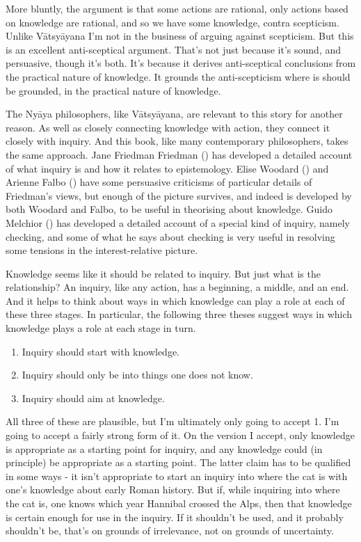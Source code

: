 \documentclass[
  10pt,
  letterpaper,
  twoside]{scrbook}
\providecommand{\tightlist}{%
  \setlength{\itemsep}{0pt}\setlength{\parskip}{0pt}}\usepackage{longtable,booktabs,array}
\begin{document}
More bluntly, the argument is that some actions are rational, only
actions based on knowledge are rational, and so we have some knowledge,
contra scepticism. Unlike Vātsyāyana I'm not in the business of arguing
against scepticism. But this is an excellent anti-sceptical argument.
That's not just because it's sound, and persuasive, though it's both.
It's because it derives anti-sceptical conclusions from the practical
nature of knowledge. It grounds the anti-scepticism where is should be
grounded, in the practical nature of knowledge.

The Nyāya philosophers, like Vātsyāyana, are relevant to this story for
another reason. As well as closely connecting knowledge with action,
they connect it closely with inquiry. And this book, like many
contemporary philosophers, takes the same approach. Jane Friedman
Friedman () has developed a detailed
account of what inquiry is and how it relates to epistemology. Elise
Woodard () and Arienne Falbo
() have some persuasive criticisms of
particular details of Friedman's views, but enough of the picture
survives, and indeed is developed by both Woodard and Falbo, to be
useful in theorising about knowledge. Guido Melchior
() has developed a detailed account of
a special kind of inquiry, namely checking, and some of what he says
about checking is very useful in resolving some tensions in the
interest-relative picture.

Knowledge seems like it should be related to inquiry. But just what is
the relationship? An inquiry, like any action, has a beginning, a
middle, and an end. And it helps to think about ways in which knowledge
can play a role at each of these three stages. In particular, the
following three theses suggest ways in which knowledge plays a role at
each stage in turn.

\begin{enumerate}
\def\labelenumi{\arabic{enumi}.}
\tightlist
\item
  Inquiry should start with knowledge.
\item
  Inquiry should only be into things one does not know.
\item
  Inquiry should aim at knowledge.
\end{enumerate}

All three of these are plausible, but I'm ultimately only going to
accept 1. I'm going to accept a fairly strong form of it. On the version
I accept, only knowledge is appropriate as a starting point for inquiry,
and any knowledge could (in principle) be appropriate as a starting
point. The latter claim has to be qualified in some ways - it isn't
appropriate to start an inquiry into where the cat is with one's
knowledge about early Roman history. But if, while inquiring into where
the cat is, one knows which year Hannibal crossed the Alps, then that
knowledge is certain enough for use in the inquiry. If it shouldn't be
used, and it probably shouldn't be, that's on grounds of irrelevance,
not on grounds of uncertainty.
\end{document}

